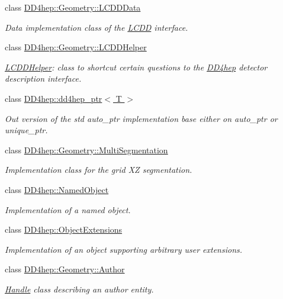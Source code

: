 \begin{DoxyCompactItemize}
class \hyperlink{class_d_d4hep_1_1_geometry_1_1_l_c_d_d_data}{D\+D4hep\+::\+Geometry\+::\+L\+C\+D\+D\+Data}
\begin{DoxyCompactList}\small\item\em Data implementation class of the \hyperlink{class_d_d4hep_1_1_geometry_1_1_l_c_d_d}{L\+C\+DD} interface. \end{DoxyCompactList}\item 
class \hyperlink{class_d_d4hep_1_1_geometry_1_1_l_c_d_d_helper}{D\+D4hep\+::\+Geometry\+::\+L\+C\+D\+D\+Helper}
\begin{DoxyCompactList}\small\item\em \hyperlink{class_d_d4hep_1_1_geometry_1_1_l_c_d_d_helper}{L\+C\+D\+D\+Helper}\+: class to shortcut certain questions to the \hyperlink{namespace_d_d4hep}{D\+D4hep} detector description interface. \end{DoxyCompactList}\item 
class \hyperlink{class_d_d4hep_1_1dd4hep__ptr}{D\+D4hep\+::dd4hep\+\_\+ptr$<$ T $>$}
\begin{DoxyCompactList}\small\item\em Out version of the std auto\+\_\+ptr implementation base either on auto\+\_\+ptr or unique\+\_\+ptr. \end{DoxyCompactList}\item 
class \hyperlink{class_d_d4hep_1_1_geometry_1_1_multi_segmentation}{D\+D4hep\+::\+Geometry\+::\+Multi\+Segmentation}
\begin{DoxyCompactList}\small\item\em Implementation class for the grid XZ segmentation. \end{DoxyCompactList}\item 
class \hyperlink{class_d_d4hep_1_1_named_object}{D\+D4hep\+::\+Named\+Object}
\begin{DoxyCompactList}\small\item\em Implementation of a named object. \end{DoxyCompactList}\item 
class \hyperlink{class_d_d4hep_1_1_object_extensions}{D\+D4hep\+::\+Object\+Extensions}
\begin{DoxyCompactList}\small\item\em Implementation of an object supporting arbitrary user extensions. \end{DoxyCompactList}\item 
class \hyperlink{class_d_d4hep_1_1_geometry_1_1_author}{D\+D4hep\+::\+Geometry\+::\+Author}
\begin{DoxyCompactList}\small\item\em \hyperlink{class_d_d4hep_1_1_handle}{Handle} class describing an author entity. \end{DoxyCompactList}\item 

\end{DoxyCompactItemize}
